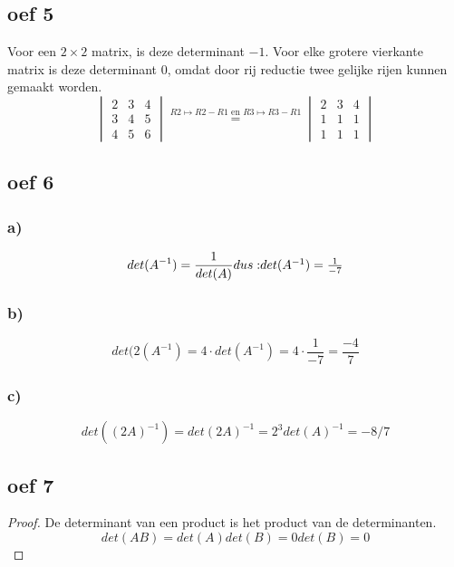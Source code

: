 \documentclass[lineaire_algebra_oplossingen.tex]{subfiles}
\begin{document}
\subsection*{oef 5}
Voor een $2\times2$ matrix, is deze determinant $-1$.
Voor elke grotere vierkante matrix is deze determinant $0$, omdat door rij reductie twee gelijke rijen kunnen gemaakt worden.
\[
\begin{vmatrix}
2 & 3 & 4\\
3 & 4 & 5\\
4 & 5 & 6
\end{vmatrix}
\overset{R2 \longmapsto R2-R1 \text{ en } R3 \longmapsto R3 - R1}{=}
\begin{vmatrix}
2 & 3 & 4\\
1 & 1 & 1\\
1 & 1 & 1
\end{vmatrix}
\]
\subsection{oef 6}
\subsubsection*{a)}
\[
det(A^{-1}) = \frac{1}{det(A)} $$
dus:
$$
det(A^{-1}) = \frac{1}{-7} 
\]
\subsubsection*{b)}
$$ det(2(A^{-1}) = 4\cdot det(A^{-1}) = 4 \cdot \frac{1}{-7} = \frac{-4}{7}
$$
\subsubsection*{c)}
\[ det((2A)^{-1}) = det(2A)^{-1} = 2^{3}det(A)^{-1} = -8/7\]
\subsection{oef 7}
\begin{proof}
De determinant van een product is het product van de determinanten.
\[
det(AB) = det(A) det(B) = 0 det(B) = 0 
\]
\end{proof}
\end{document}
